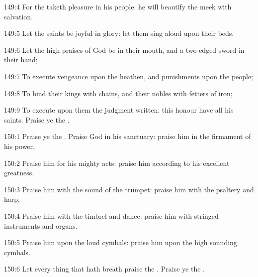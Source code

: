 149:4 For the \LORD taketh pleasure in his people: he will beautify the meek with salvation.

149:5 Let the saints be joyful in glory: let them sing aloud upon their beds.

149:6 Let the high praises of God be in their mouth, and a two-edged sword in their hand;

149:7 To execute vengeance upon the heathen, and punishments upon the people;

149:8 To bind their kings with chains, and their nobles with fetters of iron;

149:9 To execute upon them the judgment written: this honour have all his saints. Praise ye the \LORD.



150:1 Praise ye the \LORD. Praise God in his sanctuary: praise him in the firmament of his power.

150:2 Praise him for his mighty acts: praise him according to his excellent greatness.

150:3 Praise him with the sound of the trumpet: praise him with the psaltery and harp.

150:4 Praise him with the timbrel and dance: praise him with stringed instruments and organs.

150:5 Praise him upon the loud cymbals: praise him upon the high sounding cymbals.

150:6 Let every thing that hath breath praise the \LORD. Praise ye the \LORD.

